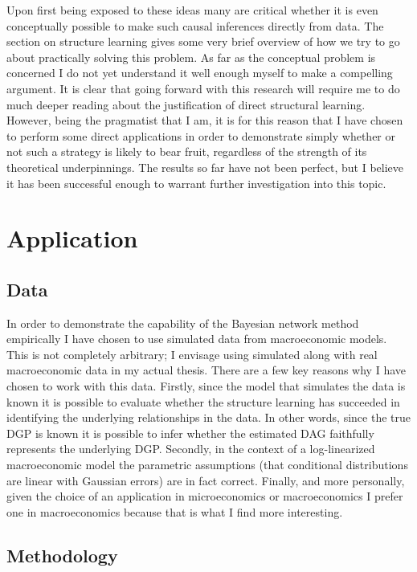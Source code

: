 \documentclass{article}
\begin{document}
Upon first being exposed to these ideas many are critical whether it is even conceptually possible to make such causal inferences directly from data. The section on structure learning gives some very brief overview of how we try to go about practically solving this problem. As far as the conceptual problem is concerned I do not yet understand it well enough myself to make a compelling argument. It is clear that going forward with this research will require me to do much deeper reading about the justification of direct structural learning. However, being the pragmatist that I am, it is for this reason that I have chosen to perform some direct applications in order to demonstrate simply whether or not such a strategy is likely to bear fruit, regardless of the strength of its theoretical underpinnings. The results so far have not been perfect, but I believe it has been successful enough to warrant further investigation into this topic.

\section{Application}

\subsection{Data}

In order to demonstrate the capability of the Bayesian network method empirically I have chosen to use simulated data from macroeconomic models. This is not completely arbitrary; I envisage using simulated along with real macroeconomic data in my actual thesis. There are a few key reasons why I have chosen to work with this data. Firstly, since the model that simulates the data is known it is possible to evaluate whether the structure learning has succeeded in identifying the underlying relationships in the data. In other words, since the true DGP is known it is possible to infer whether the estimated DAG faithfully represents the underlying DGP. Secondly, in the context of a log-linearized macroeconomic model the parametric assumptions (that conditional distributions are linear with Gaussian errors) are in fact correct. Finally, and more personally, given the choice of an application in microeconomics or macroeconomics I prefer one in macroeconomics because that is what I find more interesting.

\subsection{Methodology}
\end{document}
